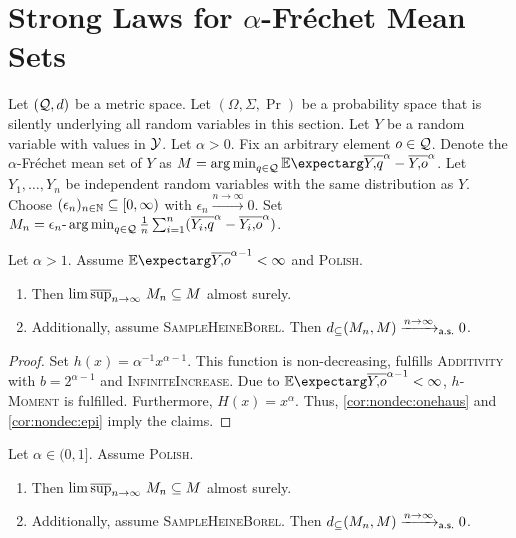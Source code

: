 %
\section{Strong Laws for $\alpha$-Fréchet Mean Sets}\label{sec:power}
%
Let $(\mathcal{Q}, d)$ be a metric space. Let $(\Omega, \Sigma, \Pr)$ be a probability space that is silently underlying all random variables in this section. Let $Y$ be a random variable with values in $\mathcal{Y}$.
Let $\alpha > 0$. Fix an arbitrary element $o\in\mathcal{Q}$. Denote the $\alpha$-Fréchet mean set of $Y$ as $M = \argmin_{q\in\mc Q} \Ex{\ol Yq^\alpha - \ol Yo^\alpha}$.
Let $Y_1, \dots, Y_n$ be independent random variables with the same distribution as $Y$.
Choose $(\epsilon_n)_{n\in\mathbb{N}}\subseteq [0,\infty)$ with $\epsilon_n \xrightarrow{n\to\infty}0$. Set $M_n =\epsilon_n\text{-}\operatorname*{arg\,min}_{q\in\mathcal{Q}} \frac1n \sum_{i=1}^n (\overline{Y_i,\!q}^\alpha - \overline{Y_i,\!o}^\alpha)$.
%
\begin{corollary}\label{cor:cons_da}
	Let $\alpha > 1$.
	Assume $\Ex{\ol Yo^{\alpha-1}} < \infty$ and \textsc{Polish}.	
	\begin{enumerate}[label=(\roman*)]
	\item Then $\operatorname*{lim\, \overline{sup}}_{n\to\infty}\, M_n \subseteq M$ almost surely.
	\item Additionally, assume \textsc{SampleHeineBorel}.
		Then $d_\subseteq(M_n, M) \xrightarrow{n\to\infty}_{\mathsf{a.s.}} 0$.
	\end{enumerate}	
\end{corollary}
%
\begin{proof}
	Set $h(x) = \alpha^{-1}x^{\alpha-1}$. This function is non-decreasing, fulfills \textsc{Additivity} with $b = 2^{\alpha-1}$ and \textsc{InfiniteIncrease}.
	Due to $\Ex{\ol Yo^{\alpha-1}} < \infty$, \textsc{$h$-Moment} is fulfilled. Furthermore, $H(x) = x^\alpha$. Thus, \autoref{cor:nondec:onehaus} and \autoref{cor:nondec:epi} imply the claims.
\end{proof}
%
\begin{corollary}\label{cor:median}
	Let $\alpha \in (0,1]$. Assume \textsc{Polish}.
	\begin{enumerate}[label=(\roman*)]
	\item Then $\operatorname*{lim\, \overline{sup}}_{n\to\infty}\, M_n \subseteq M$ almost surely.
	\item Additionally, assume \textsc{SampleHeineBorel}.
		Then $d_\subseteq(M_n, M) \xrightarrow{n\to\infty}_{\mathsf{a.s.}} 0$.
	\end{enumerate}	
\end{corollary}
%
